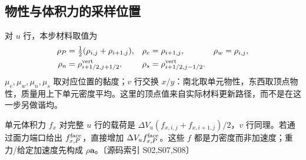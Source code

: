\documentclass[UTF8,a4paper,11pt,fontset=fandol]{ctexart}
\newcommand{\src}[1]{\textcolor{ink}{\small〔源码索引 #1〕}}
\begin{document}
\subsection{物性与体积力的采样位置}
对 $u$ 行，本步材料取值为
\begin{align}
 \rho_P&=\tfrac12(\rho_{i,j}+\rho_{i+1,j}),&
 \rho_e&=\rho_{i+1,j},&\rho_w&=\rho_{i,j},\\
 \rho_n&=\rho^{\rm vert}_{i+1/2,j+1/2},&
 \rho_s&=\rho^{\rm vert}_{i+1/2,j-1/2}.\label{eq:material-template}
\end{align}
$\mu_e,\mu_w,\mu_n,\mu_s$ 取对应位置的黏度；$v$ 行交换 $x/y$：南北取单元物性，东西取顶点物性，质量用上下单元密度平均。这里的顶点值来自实际材料更新路径，而不是在这一步另做谐均。

单元体积力 $f_x$ 对完整 $u$ 行的载荷是 $\Delta V_u(f_{x,i,j}+f_{x,i+1,j})/2$，$v$ 行同理。若通过面力端口给出 $f_{x,P}^{\rm face}$，直接增加 $\Delta V_u f_{x,P}^{\rm face}$。这些 $f$ 都是力密度而非加速度；重力/给定加速度先构成 $\rho\bm a$。\src{S02,S07,S08}
\end{document}
